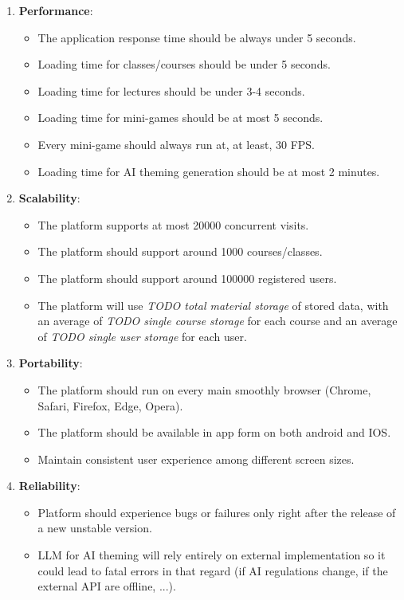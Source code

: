 \begin{enumerate}
	\item \textbf{Performance}: 
	\begin{itemize}
		\item The application response time should be always under 5 seconds.
		\item Loading time for classes/courses should be under 5 seconds.
		\item Loading time for lectures should be under 3-4 seconds.
		\item Loading time for mini-games should be at most 5 seconds.
		\item Every mini-game should always run at, at least, 30 FPS.
		\item Loading time for AI theming generation should be at most 2 minutes.
	\end{itemize}
	
	\item \textbf{Scalability}: 
	\begin{itemize}
		\item The platform supports at most 20000 concurrent visits.
		\item The platform should support around 1000 courses/classes.
		\item The platform should support around 100000 registered users.
		\item The platform will use \textit{TODO total material storage} of stored data, with an average of \textit{TODO single course storage} for each course and an average of \textit{TODO single user storage} for each user.
	\end{itemize}
	
	\item \textbf{Portability}: 
	\begin{itemize}
		\item The platform should run on every main smoothly browser (Chrome, Safari, Firefox, Edge, Opera).
		\item The platform should be available in app form on both android and IOS.
		\item Maintain consistent user experience among different screen sizes.
	\end{itemize}
	
	\item \textbf{Reliability}: 
	\begin{itemize}
		\item Platform should experience bugs or failures only right after the release of a new unstable version.
		\item LLM for AI theming will rely entirely on external implementation so it could lead to fatal errors in that regard (if AI regulations change, if the external API are offline, ...).
	\end{itemize}
	

\end{enumerate}
